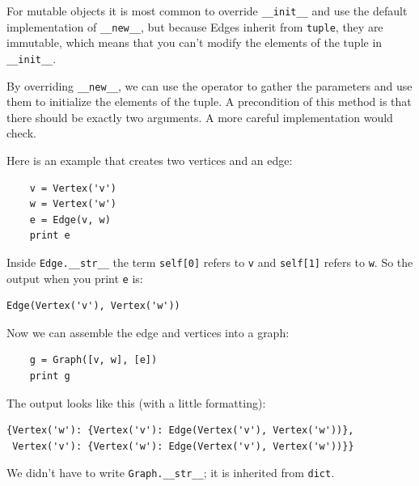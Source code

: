 \documentclass[10pt]{book}
\begin{document}
For mutable objects it is most common to override
\verb"__init__" and use the default implementation of
\verb"__new__", but because Edges inherit from {\tt tuple}, they
are immutable, which means that you can't modify the elements
of the tuple in \verb"__init__".

By overriding \verb"__new__", we can use the {\tt *} operator to
gather the parameters and use them to initialize the elements of
the tuple.  A precondition of this method is that there should
be exactly two arguments.  A more careful implementation would
check.

Here is an example that creates two vertices and an edge:

\begin{verbatim}
    v = Vertex('v')
    w = Vertex('w')
    e = Edge(v, w)
    print e
\end{verbatim}

Inside \verb"Edge.__str__" the term {\tt self[0]} refers  
to {\tt v} and {\tt self[1]} refers to {\tt w}.  So the output
when you print {\tt e} is:

\begin{verbatim}
Edge(Vertex('v'), Vertex('w'))
\end{verbatim}

Now we can assemble the edge and vertices into a graph:

\begin{verbatim}
    g = Graph([v, w], [e])
    print g
\end{verbatim}

The output looks like this (with a little formatting):

\begin{verbatim}
{Vertex('w'): {Vertex('v'): Edge(Vertex('v'), Vertex('w'))},
 Vertex('v'): {Vertex('w'): Edge(Vertex('v'), Vertex('w'))}}
\end{verbatim}

We didn't have to write \verb"Graph.__str__"; it is inherited
from {\tt dict}.
\end{document}
